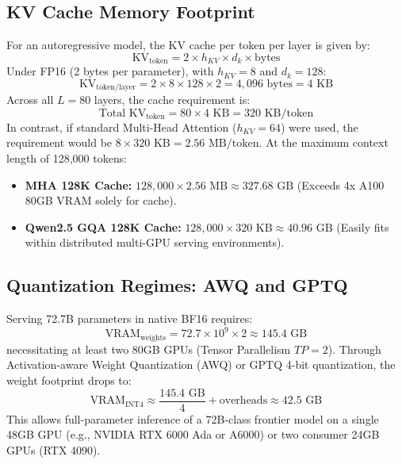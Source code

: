 \documentclass[conference]{IEEEtran}
\begin{document}
\subsection{KV Cache Memory Footprint}
For an autoregressive model, the KV cache per token per layer is given by:
\begin{equation}
\text{KV}_{\text{token}} = 2 \times h_{KV} \times d_k \times \text{bytes}
\end{equation}
Under FP16 (2 bytes per parameter), with $h_{KV} = 8$ and $d_k = 128$:
\begin{equation}
\text{KV}_{\text{token/layer}} = 2 \times 8 \times 128 \times 2 = 4,096 \text{ bytes} = 4 \text{ KB}
\end{equation}
Across all $L = 80$ layers, the cache requirement is:
\begin{equation}
\text{Total KV}_{\text{token}} = 80 \times 4 \text{ KB} = 320 \text{ KB/token}
\end{equation}
In contrast, if standard Multi-Head Attention ($h_{KV} = 64$) were used, the requirement would be $8 \times 320 \text{ KB} = 2.56 \text{ MB/token}$. At the maximum context length of 128,000 tokens:
\begin{itemize}
    \item \textbf{MHA 128K Cache:} $128,000 \times 2.56 \text{ MB} \approx 327.68 \text{ GB}$ (Exceeds 4x A100 80GB VRAM solely for cache).
    \item \textbf{Qwen2.5 GQA 128K Cache:} $128,000 \times 320 \text{ KB} \approx 40.96 \text{ GB}$ (Easily fits within distributed multi-GPU serving environments).
\end{itemize}

\subsection{Quantization Regimes: AWQ and GPTQ}
Serving 72.7B parameters in native BF16 requires:
\begin{equation}
\text{VRAM}_{\text{weights}} = 72.7 \times 10^9 \times 2 \approx 145.4 \text{ GB}
\end{equation}
necessitating at least two 80GB GPUs (Tensor Parallelism $TP=2$). Through Activation-aware Weight Quantization (AWQ) \cite{lin2023awq} or GPTQ 4-bit quantization, the weight footprint drops to:
\begin{equation}
\text{VRAM}_{\text{INT4}} \approx \frac{145.4 \text{ GB}}{4} + \text{overheads} \approx 42.5 \text{ GB}
\end{equation}
This allows full-parameter inference of a 72B-class frontier model on a single 48GB GPU (e.g., NVIDIA RTX 6000 Ada or A6000) or two consumer 24GB GPUs (RTX 4090).
\end{document}
